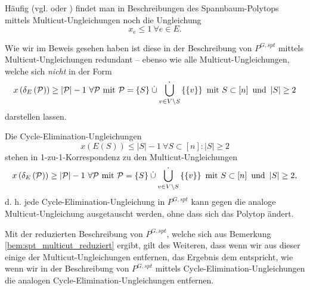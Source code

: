 \documentclass[10p,a4paper,BCOR = 12mm, DIV=15]{scrbook}
\begin{document}
\begin{Bem}
\label{bem:spt_multicut_reduziert}
Häufig (vgl. \cite{magnanti_wolsey1995} oder \cite{korte2012combinatorial}) findet man in Beschreibungen des Spann\-baum-Polytops mittels Multicut-Ungleichungen noch die Ungleichung
\begin{displaymath}
x_e \leq 1 \ \forall e \in E.
\end{displaymath}

Wie wir im Beweis gesehen haben ist diese in der Beschreibung von $P^{G, spt}$ mittels Multicut-Ungleichungen redundant -- ebenso wie alle Multicut-Ungleichungen, welche sich \emph{nicht} in der Form
\begin{displaymath}
x\left(\delta_E\left(\mathcal{P}\right)\right) \geq \left|\mathcal{P}\right|-1\ \forall \mathcal{P} \textnormal{ mit } \mathcal{P} = \left\{S\right\} \mathbin{\dot{\cup}} \mathop{\dot{\bigcup}}_{v \in V \backslash S} \left\{\left\{v\right\}\right\} \textnormal{ mit } S \subset \left[n\right] \textnormal{ und } \left|S\right| \geq 2
\end{displaymath}
darstellen lassen.
\end{Bem}

\begin{Bem}
\label{bem:spt_multicut_austausch}
Die Cycle-Elimination-Ungleichungen
\begin{displaymath}
x\left(E\left(S\right)\right) \leq \left|S\right|-1\ \forall S \subset \left[n\right]: \left|S\right| \geq 2
\end{displaymath}
stehen in 1-zu-1-Korrespondenz zu den Multicut-Ungleichungen 
\begin{displaymath}
x\left(\delta_E\left(\mathcal{P}\right)\right) \geq \left|\mathcal{P}\right|-1\ \forall \mathcal{P} \textnormal{ mit } \mathcal{P} = \left\{S\right\} \mathbin{\dot{\cup}} \mathop{\dot{\bigcup}}_{v \in V \backslash S} \left\{\left\{v\right\}\right\} \textnormal{ mit } S \subset \left[n\right] \textnormal{ und } \left|S\right| \geq 2,
\end{displaymath}
d. h. jede Cycle-Elimination-Ungleichung in $P^{G, spt}$ kann gegen die analoge Multicut-Ungleichung ausgetauscht werden, ohne dass sich das Polytop ändert.

Mit der reduzierten Beschreibung von $P^{G, spt}$, welche sich aus Bemerkung \ref{bem:spt_multicut_reduziert} ergibt, gilt des Weiteren, dass wenn wir aus dieser einige der Multicut-Ungleichungen entfernen, das Ergebnis dem entspricht, wie wenn wir in der Beschreibung von $P^{G, spt}$ mittels Cycle-Elimination-Ungleichungen die analogen Cycle-Elimination-Unglei\-ch\-un\-gen entfernen.
\end{Bem}
\end{document}
